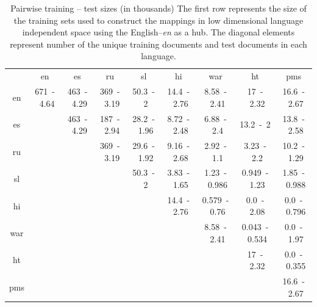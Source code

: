 \documentclass[twoside,11pt]{article}
\begin{document}
%

{
\renewcommand\tabcolsep{3pt}
\begin{table}[h!]
\centering
\caption{Pairwise training -- test sizes (in thousands)
The first row represents the size of the training sets used to construct the mappings in low dimensional language independent space using the English--\emph{en} as a hub. The diagonal elements represent number of the unique training documents and test documents in each language.
}
\label{table:train_test}
{
\small
\begin{tabular}{c|c|c|c|c|c|c|c|c|}
&	en&	es&	ru&	sl&	hi&	war&	ht&	pms\\\cline{1-9}
en&	671~-~4.64&	463~-~4.29&	369~-~3.19&	50.3~-~2&	14.4~-~2.76&	8.58~-~2.41&	 17~-~2.32&	16.6~-~2.67\\
\cline{2-9}
es&	\multicolumn{1}{c|}{}	&	463~-~4.29&	187~-~2.94&	28.2~-~1.96&	8.72~-~2.48&	 6.88~-~2.4&	13.2~-~2&	 13.8~-~2.58\\
\cline{3-9}
ru&	\multicolumn{2}{c|}{}	&	369~-~3.19&	29.6~-~1.92&	9.16~-~2.68&	2.92~-~1.1&	 3.23~-~2.2&	10.2~-~1.29\\
\cline{4-9}
sl&	\multicolumn{3}{c|}{}	&	50.3~-~2&	3.83~-~1.65&	1.23~-~0.986&	0.949~-~1.23&	 1.85~-~0.988\\
\cline{5-9}
hi&	\multicolumn{4}{c|}{}	&	14.4~-~2.76&	0.579~-~0.76&	0.0~-~2.08&	0.0~-~0.796\\
\cline{6-9}
war&	\multicolumn{5}{c|}{}	&	8.58~-~2.41&	0.043~-~0.534&	0.0~-~1.97\\
\cline{7-9}
ht&	\multicolumn{6}{c|}{}	&	17~-~2.32&	0.0~-~0.355\\
\cline{8-9}
pms&	\multicolumn{7}{c|}{}	&	16.6~-~2.67\\
\cline{9-9}
\end{tabular}
}
\end{table}
}
\end{document}
